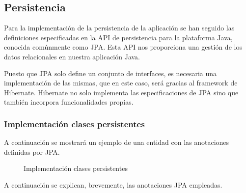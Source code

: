 \subsection{Persistencia}
Para la implementación de la persistencia de la aplicación se han seguido las definiciones especificadas en la API de persistencia para la plataforma Java, conocida comúnmente como JPA. Esta API nos proporciona una gestión de los datos relacionales en nuestra aplicación Java.


Puesto que JPA solo define un conjunto de interfaces, es necesaria una implementación de las mismas, que en este caso, será gracias al framework de Hibernate. Hibernate no solo implementa las especificaciones de JPA sino que también incorpora funcionalidades propias.


\subsubsection*{Implementación clases persistentes}
A continuación se mostrará un ejemplo de una entidad con las anotaciones definidas por JPA.

\begin{figure}[H]
\centering
{}
\caption{Implementación clases persistentes}
\end{figure}

A continuación se explican, brevemente, las anotaciones JPA empleadas.

